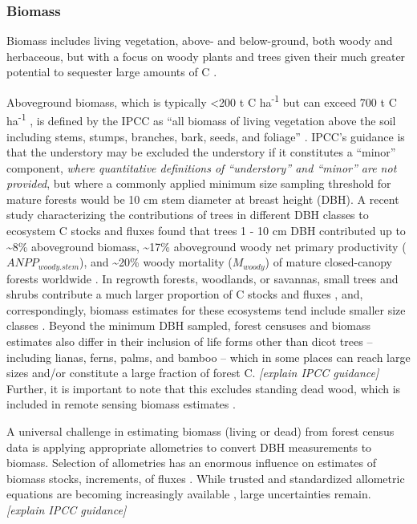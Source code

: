 \documentclass[, manuscript]{copernicus}
\begin{document}
\subsubsection{Biomass}

Biomass includes living vegetation, above- and below-ground, both woody
and herbaceous, but with a focus on woody plants and trees given their
much greater potential to sequester large amounts of C
\citep{ipcc_2006_2006}.

Aboveground biomass, which is typically \textless200 t C
ha\textsuperscript{-1} but can exceed 700 t C ha\textsuperscript{-1}
\citep{anderson-teixeira_carbon_2021}, is defined by the IPCC as ``all
biomass of living vegetation above the soil including stems, stumps,
branches, bark, seeds, and foliage''
\citep{ipcc_good_2003, ipcc_2006_2006}. IPCC's guidance is that the
understory may be excluded the understory if it constitutes a ``minor''
component, \emph{where quantitative definitions of ``understory'' and
``minor'' are not provided}, but where a commonly applied minimum size
sampling threshold for mature forests would be 10 cm stem diameter at
breast height (DBH). A recent study characterizing the contributions of
trees in different DBH classes to ecosystem C stocks and fluxes found
that trees 1 - 10 cm DBH contributed up to \textasciitilde8\%
aboveground biomass, \textasciitilde17\% aboveground woody net primary
productivity (\(ANPP_{woody.stem}\)), and \textasciitilde20\% woody
mortality (\(M_{woody}\)) of mature closed-canopy forests worldwide
\citep{piponiot_distribution_2022}. In regrowth forests, woodlands, or
savannas, small trees and shrubs contribute a much larger proportion of
C stocks and fluxes \citep{piponiot_distribution_2022, refs}, and,
correspondingly, biomass estimates for these ecosystems tend include
smaller size classes \citep[e.g.,][]{refs}. Beyond the minimum DBH
sampled, forest censuses and biomass estimates also differ in their
inclusion of life forms other than dicot trees -- including lianas,
ferns, palms, and bamboo -- which in some places can reach large sizes
and/or constitute a large fraction of forest C. \emph{{[}explain IPCC
guidance{]}} Further, it is important to note that this excludes
standing dead wood, which is included in remote sensing biomass
estimates \citep{duncanson_aboveground_2021}.

A universal challenge in estimating biomass (living or dead) from forest
census data is applying appropriate allometries to convert DBH
measurements to biomass. Selection of allometries has an enormous
influence on estimates of biomass stocks, increments, of fluxes
\citep{clark_landscapescale_2000, clark_net_2001}. While trusted and
standardized allometric equations are becoming increasingly available
\citep{chave_improved_2014, rejou-mechain_biomass_2017, gonzalez-akre_allodb_2022},
large uncertainties remain. \emph{{[}explain IPCC guidance{]}}
\end{document}

